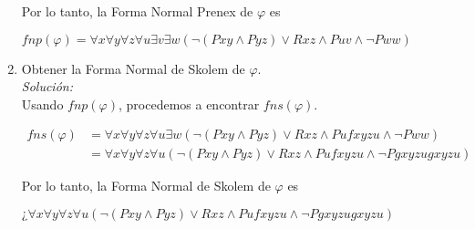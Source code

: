 \documentclass[letterpaper,12pt]{article}
\begin{document}
\begin{enumerate}
    Por lo tanto, la Forma Normal Prenex de $\varphi$ es 
    
    \begin{center}
        $fnp(\varphi) = 
        \forall x \forall y \forall z \forall u \exists v \exists w
        (\neg (Pxy \land Pyz) \lor Rxz \land Puv \land \neg Pww)$
    \end{center}

    \item Obtener la Forma Normal de Skolem de $\varphi$. \\
    \textit{Solución:} \\
    Usando $fnp(\varphi)$, procedemos a encontrar $fns(\varphi)$.
    
    \begin{align*}
        fns(\varphi) 
        &= \forall x \forall y \forall z \forall u \exists w
        (\neg (Pxy \land Pyz) \lor Rxz \land Pufxyzu \land \neg Pww) \\
        &= \forall x \forall y \forall z \forall u
        (\neg (Pxy \land Pyz) \lor Rxz \land Pufxyzu \land \neg Pgxyzugxyzu)
    \end{align*}

    Por lo tanto, la Forma Normal de Skolem de $\varphi$ es 
    
    \begin{center}
        $¿\forall x \forall y \forall z \forall u
        (\neg (Pxy \land Pyz) \lor Rxz \land Pufxyzu \land \neg Pgxyzugxyzu)$
    \end{center}
\end{enumerate}
\end{document}
